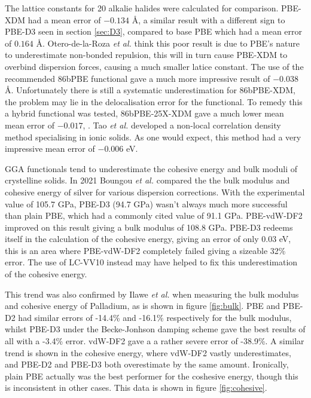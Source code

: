 \documentclass[10pt,a4paper,twocolumn,twoside]{extarticle}
\newcommand{\al}{\emph{et al. }}
\newcommand{\oA}{\si{\angstrom}}
\begin{document}
	The lattice constants for 20 alkalie halides were calculated for comparison. PBE-XDM had a mean error of $-0.134$ \oA, a similar result with a different sign to PBE-D3 seen in section \ref{sec:D3}, compared to base PBE which had a mean error of  $0.164$ \oA. Otero-de-la-Roza \al think this poor result is due to PBE's nature to underestimate non-bonded repulsion\cite{PBE-underbinding}, this will in turn cause PBE-XDM to overbind dispersion forces, causing a much smaller latice constant. The use of the recommended 86bPBE functional gave a much more impressive result of $-0.038$ \oA. Unfortunately there is still a systematic underestimation for 86bPBE-XDM, the problem may lie in the delocalisation error for the functional\cite{86bPBE-delocalisation}. To remedy this a hybrid functional was tested, 86bPBE-25X-XDM gave a much lower mean mean error of $-0.017$, \cite{Roza-2020-XDM}. Tao \al developed a non-local correlation density method specialising in ionic solids. As one would expect, this method had a very impressive mean error of $-0.006$ eV.\cite{Tao-vdW}

	GGA functionals tend to underestimate the cohesive energy and bulk moduli of crystelline solids. In 2021 Boungou \al compared the the bulk modulus and cohesive energy of silver for various dispersion corrections.\cite{Boungou2021} With the experimental value of 105.7 GPa, PBE-D3 (94.7 GPa) wasn't always much more successful than plain PBE, which had a commonly cited value of 91.1 GPa. PBE-vdW-DF2 improved on this result giving a bulk modulus of 108.8 GPa. PBE-D3 redeems itself in the calculation of the cohesive energy, giving an error of only 0.03 eV, this is an area where PBE-vdW-DF2 completely failed giving a sizeable 32\% error. The use of LC-VV10 instead may have helped to fix this underestimation of the cohesive energy. 

	This trend was also confirmed by Ilawe \al when measuring the bulk modulus and cohesive energy of Palladium, as is shown in figure \ref{fig:bulk}.\cite{Ilawe2015} PBE and PBE-D2 had similar errors of -14.4\% and -16.1\% respectively for the bulk modulus, whilst PBE-D3 under the Becke-Jonhson damping scheme\cite{BJ-Damp} gave the best results of all with a -3.4\% error. vdW-DF2 gave a a rather severe error of -38.9\%. A similar trend is shown in the cohesive energy, where vdW-DF2 vastly underestimates, and PBE-D2 and PBE-D3 both overestimate by the same amount. Ironically, plain PBE actually was the best performer for the coshesive energy, though this is inconsistent in other cases. This data is shown in figure \ref{fig:cohesive}.
\end{document}
